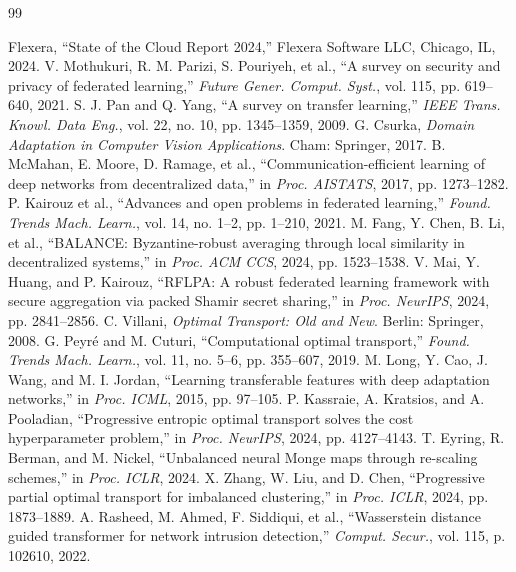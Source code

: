 \documentclass{ieeeaccess}
\theoremstyle{plain}
\theoremstyle{definition}
\theoremstyle{remark}
\begin{document}

\begin{thebibliography}{99}

 Flexera, ``State of the Cloud Report 2024,'' Flexera Software LLC, Chicago, IL, 2024.
 V. Mothukuri, R. M. Parizi, S. Pouriyeh, et al., ``A survey on security and privacy of federated learning,'' \textit{Future Gener. Comput. Syst.}, vol. 115, pp. 619--640, 2021.
 S. J. Pan and Q. Yang, ``A survey on transfer learning,'' \textit{IEEE Trans. Knowl. Data Eng.}, vol. 22, no. 10, pp. 1345--1359, 2009.
 G. Csurka, \textit{Domain Adaptation in Computer Vision Applications}. Cham: Springer, 2017.
 B. McMahan, E. Moore, D. Ramage, et al., ``Communication-efficient learning of deep networks from decentralized data,'' in \textit{Proc. AISTATS}, 2017, pp. 1273--1282.
 P. Kairouz et al., ``Advances and open problems in federated learning,'' \textit{Found. Trends Mach. Learn.}, vol. 14, no. 1--2, pp. 1--210, 2021.
 M. Fang, Y. Chen, B. Li, et al., ``BALANCE: Byzantine-robust averaging through local similarity in decentralized systems,'' in \textit{Proc. ACM CCS}, 2024, pp. 1523--1538.
 V. Mai, Y. Huang, and P. Kairouz, ``RFLPA: A robust federated learning framework with secure aggregation via packed Shamir secret sharing,'' in \textit{Proc. NeurIPS}, 2024, pp. 2841--2856.
 C. Villani, \textit{Optimal Transport: Old and New}. Berlin: Springer, 2008.
 G. Peyr\'{e} and M. Cuturi, ``Computational optimal transport,'' \textit{Found. Trends Mach. Learn.}, vol. 11, no. 5--6, pp. 355--607, 2019.
 M. Long, Y. Cao, J. Wang, and M. I. Jordan, ``Learning transferable features with deep adaptation networks,'' in \textit{Proc. ICML}, 2015, pp. 97--105.
 P. Kassraie, A. Kratsios, and A. Pooladian, ``Progressive entropic optimal transport solves the cost hyperparameter problem,'' in \textit{Proc. NeurIPS}, 2024, pp. 4127--4143.
 T. Eyring, R. Berman, and M. Nickel, ``Unbalanced neural Monge maps through re-scaling schemes,'' in \textit{Proc. ICLR}, 2024.
 X. Zhang, W. Liu, and D. Chen, ``Progressive partial optimal transport for imbalanced clustering,'' in \textit{Proc. ICLR}, 2024, pp. 1873--1889.
 A. Rasheed, M. Ahmed, F. Siddiqui, et al., ``Wasserstein distance guided transformer for network intrusion detection,'' \textit{Comput. Secur.}, vol. 115, p. 102610, 2022.

\end{thebibliography}
\end{document}
